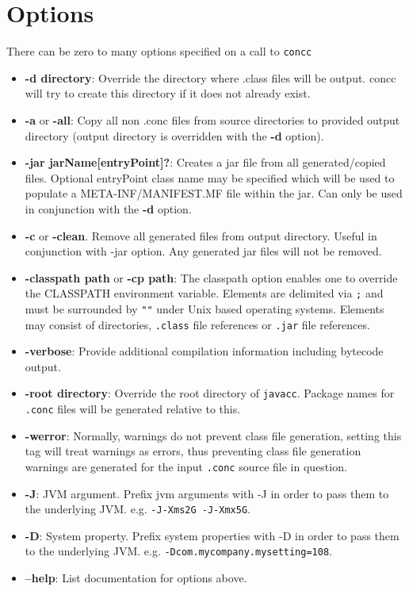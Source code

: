 \documentclass[conc-doc]{subfiles}
\begin{document}
\section{Options}
There can be zero to many options specified on a call to \lstinline[language=None]{concc}
\begin{itemize}
	\item \textbf{-d directory}: Override the directory where .class files will be output. concc will try to create this directory if it does not already exist.
	\item \textbf{-a} or \textbf{-all}: Copy all non .conc files from source directories to provided output directory (output directory is overridden with the \textbf{-d} option).
	\item \textbf{-jar jarName[entryPoint]?}: Creates a jar file from all generated/copied files. Optional entryPoint class name may be specified which will be used to populate a META-INF/MANIFEST.MF file within the jar. Can only be used in conjunction with the \textbf{-d} option.
	\item \textbf{-c} or \textbf{-clean}. Remove all generated files from output directory. Useful in conjunction with -jar option. Any generated jar files will not be removed.	
	\item \textbf{-classpath path} or \textbf{-cp path}: The classpath option enables one to override the CLASSPATH environment variable. Elements are delimited via \lstinline[language=None]{;} and must be surrounded by \lstinline[language=None]{""} under Unix based operating systems. Elements may consist of directories, \lstinline[language=None]{.class} file references or \lstinline[language=None]{.jar} file references.
	\item \textbf{-verbose}: Provide additional compilation information including bytecode output.
	\item \textbf{-root directory}: Override the root directory of \lstinline[language=None]{javacc}. Package names for \lstinline[language=None]{.conc} files will be generated relative to this.
	\item \textbf{-werror}: Normally, warnings do not prevent class file generation, setting this tag will treat warnings as errors, thus preventing class file generation warnings are generated for the input \lstinline[language=None]{.conc} source file in question.
	\item \textbf{-J}: JVM argument. Prefix jvm arguments with -J in order to pass them to the underlying JVM. e.g. \lstinline[language=None]{-J-Xms2G -J-Xmx5G}.
	\item \textbf{-D}: System property. Prefix system properties with -D in order to pass them to the underlying JVM. e.g. \lstinline[language=None]{-Dcom.mycompany.mysetting=108}.
	\item \textbf{--help}: List documentation for options above.
\end{itemize}
\end{document}
